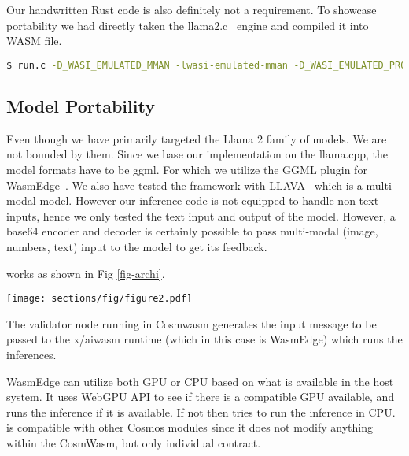 Our handwritten Rust code is also definitely not a requirement. To showcase portability we had directly taken the llama2.c~\cite{karpathy} engine and compiled it into WASM file.

\begin{lstlisting}[caption={llama2.c wasm},breaklines, language=bash, label=llama2.c wasm]
$ run.c -D_WASI_EMULATED_MMAN -lwasi-emulated-mman -D_WASI_EMULATED_PROCESS_CLOCKS -lwasi-emulated-process-clocks -o run.wasm
\end{lstlisting}

\subsection{Model Portability}

Even though we have primarily targeted the Llama 2 family of models. We are not bounded by them. Since we base our implementation on the llama.cpp, the model formats have to be ggml. For which we utilize the GGML plugin for WasmEdge~\cite{WasmEdge-WASINN}. We also have tested the framework with LLAVA~\cite{liu2023llava} which is a multi-modal model. However our inference code is not equipped to handle non-text inputs, hence we only tested the text input and output of the model. However, a base64 encoder and decoder is certainly possible to pass multi-modal (image, numbers, text) input to the model to get its feedback.

\sln{} works as shown in Fig  \ref{fig-archi}.

\begin{figure*}%
	\centering
	\texttt{[image: sections/fig/figure2.pdf]}
	\caption{Working of \sln{}.}   
	\label{fig-archi}
\end{figure*}

The validator node running in Cosmwasm generates the input message to be passed to the x/aiwasm runtime (which in this case is WasmEdge) which runs the inferences. 

WasmEdge can utilize both GPU or CPU based on what is available in the host system. It uses WebGPU API to see if there is a compatible GPU available, and runs the inference if it is available. If not then tries to run the inference in CPU. \sln{} is compatible with other Cosmos modules since it does not modify anything within the CosmWasm, but only individual contract. 
